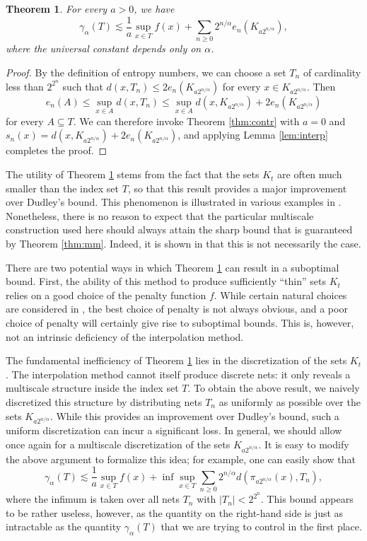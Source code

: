 \documentclass[10pt,reqno]{amsart}
\newtheorem{thm}{Theorem}[section]
\theoremstyle{definition}
\numberwithin{equation}{section}
\numberwithin{figure}{section}
\numberwithin{table}{section}
\begin{document}
\begin{thm}
\label{thm:interp}
For every $a>0$, we have
$$
	\gamma_\alpha(T) \lesssim
	\frac{1}{a}\sup_{x\in T}f(x) +
	\sum_{n\ge 0} 2^{n/\alpha}e_n(K_{a2^{n/\alpha}}),
$$
where the universal constant depends only on $\alpha$.
\end{thm}

\begin{proof}
By the definition of entropy numbers, we can choose a set
$T_n$ of cardinality less than $2^{2^n}$ such that
$d(x,T_n)\le 2e_n(K_{a2^{n/\alpha}})$ for every $x\in K_{a2^{n/\alpha}}$.
Then
$$
	e_n(A) \le \sup_{x\in A}d(x,T_n) \le
	\sup_{x\in A}d(x,K_{a2^{n/\alpha}}) +
	2e_n(K_{a2^{n/\alpha}})
$$
for every $A\subseteq T$. We can therefore invoke Theorem 
\ref{thm:contr} with
$a=0$ and $s_n(x)=d(x,K_{a2^{n/\alpha}})+2e_n(K_{a2^{n/\alpha}})$,
and applying Lemma \ref{lem:interp} completes the proof.
\end{proof}

The utility of Theorem \ref{thm:interp} stems from the fact that the 
sets $K_t$ are often much smaller than the index set $T$, so that this 
result provides a major improvement over Dudley's bound. This phenomenon 
is illustrated in various examples in \cite{vH16a}. Nonetheless, there is 
no reason to expect that the particular multiscale construction used here 
should always attain the sharp bound that is guaranteed by Theorem 
\ref{thm:mm}. Indeed, it is shown in \cite[section 3.3]{vH16a} that this 
is not necessarily the case.

There are two potential ways in which Theorem \ref{thm:interp} can result 
in a suboptimal bound. First, the ability of this method to produce 
sufficiently ``thin'' sets $K_t$ relies on a good choice of the penalty 
function $f$. While certain natural choices are considered in 
\cite{vH16a}, the best choice of penalty is not always obvious, and a poor 
choice of penalty will certainly give rise to suboptimal bounds. This is, 
however, not an intrinsic deficiency of the interpolation method.

The fundamental inefficiency of Theorem \ref{thm:interp} lies in the 
discretization of the sets $K_t$. The interpolation method cannot itself 
produce discrete nets: it only reveals a multiscale structure inside 
the index set $T$. To obtain the above result, we naively discretized this 
structure by distributing nets $T_n$ as uniformly as possible over the 
sets $K_{a2^{n/\alpha}}$. While this provides an improvement over 
Dudley's bound, such a uniform discretization can incur a significant 
loss. In general, we should allow once again for a multiscale 
discretization of the sets $K_{a2^{n/\alpha}}$. It is easy to modify the 
above argument to formalize this idea; for example, one can easily show 
that
$$
	\gamma_\alpha(T) \lesssim
	\frac{1}{a}\sup_{x\in T}f(x) + \inf \sup_{x\in T}
	\sum_{n\ge 0}2^{n/\alpha}d(\pi_{a2^{n/\alpha}}(x),T_n),
$$
where the infimum is taken over all nets $T_n$ with
$|T_n|<2^{2^{n}}$. This bound appears to be rather useless, however, as 
the quantity on the right-hand side is just as intractable as the quantity
$\gamma_\alpha(T)$ that we are trying to control in the first place.
\end{document}
